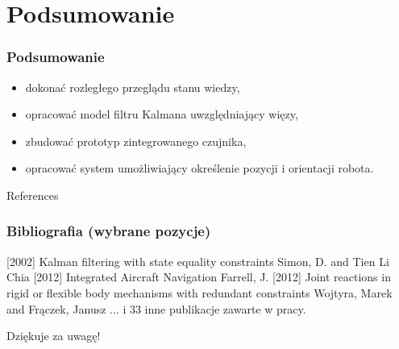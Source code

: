 \documentclass[aspectratio=169]{beamer}  %
\begin{document}
\section{Podsumowanie}

\begin{frame}
	\frametitle{Podsumowanie}	
	\begin{itemize}
		\item<1-> dokonać rozległego przeglądu stanu wiedzy,
		\item<1-> opracować model filtru Kalmana uwzględniający więzy,
		\item<1-> zbudować prototyp zintegrowanego czujnika,
		\item<1-> opracować system umożliwiający określenie pozycji i orientacji robota.
	\end{itemize}
\end{frame}

\begin{frame}{References}
	\frametitle{Bibliografia (wybrane pozycje)}
	\begin{thebibliography}{10}
		\beamertemplatebookbibitems
		 Kalman filtering with state equality constraints
		\newblock Simon, D. and Tien Li Chia
		 Integrated Aircraft Navigation
		\newblock Farrell, J.
		 Joint reactions in rigid or flexible body mechanisms with redundant constraints
		\newblock Wojtyra, Marek and Frączek, Janusz
		 ... i 33 inne publikacje zawarte w pracy.
	\end{thebibliography}
\end{frame}

\begin{frame}
	  \begin{center}
	\Huge Dziękuje za uwagę!
	\end{center}
\end{frame}
\end{document}

